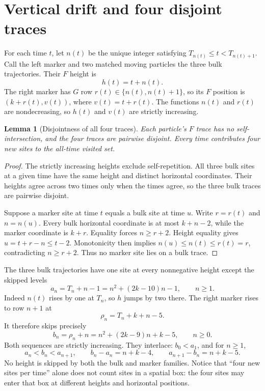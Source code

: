 \documentclass[11pt,letterpaper]{article}
\numberwithin{equation}{section}
\newtheorem{lemma}[theorem]{Lemma}
\theoremstyle{definition}
\theoremstyle{remark}
\begin{document}
\section{Vertical drift and four disjoint traces}\label{smc:bp:sec:drift}
For each time $t$, let $n(t)$ be the unique integer satisfying $T_{n(t)}\le t<T_{n(t)+1}$. Call the left marker and two matched moving particles the three bulk trajectories. Their $F$ height is
\[
h(t)=t+n(t).
\]
The right marker has $G$ row $r(t)\in\{n(t),n(t)+1\}$, so its $F$ position is $(k+r(t),v(t))$, where $v(t)=t+r(t)$. The functions $n(t)$ and $r(t)$ are nondecreasing, so $h(t)$ and $v(t)$ are strictly increasing.

\begin{lemma}[Disjointness of all four traces]\label{smc:bp:lem:traces}
Each particle's $F$ trace has no self-intersection, and the four traces are pairwise disjoint. Every time contributes four new sites to the all-time visited set.
\end{lemma}
\begin{proof}
The strictly increasing heights exclude self-repetition. All three bulk sites at a given time have the same height and distinct horizontal coordinates. Their heights agree across two times only when the times agree, so the three bulk traces are pairwise disjoint.

Suppose a marker site at time $t$ equals a bulk site at time $u$. Write $r=r(t)$ and $n=n(u)$. Every bulk horizontal coordinate is at most $k+n-2$, while the marker coordinate is $k+r$. Equality forces $n\ge r+2$. Height equality gives $u=t+r-n\le t-2$. Monotonicity then implies $n(u)\le n(t)\le r(t)=r$, contradicting $n\ge r+2$. Thus no marker site lies on a bulk trace.
\end{proof}

The three bulk trajectories have one site at every nonnegative height except the skipped levels
\begin{equation}\label{smc:bp:eq:a}
a_n=T_n+n-1=n^2+(2k-10)n-1,\qquad n\ge1.
\end{equation}
Indeed $n(t)$ rises by one at $T_n$, so $h$ jumps by two there. The right marker rises to row $n+1$ at
\[
\rho_n=T_n+k+n-5.
\]
It therefore skips precisely
\begin{equation}\label{smc:bp:eq:b}
b_n=\rho_n+n=n^2+(2k-9)n+k-5,\qquad n\ge0.
\end{equation}
Both sequences are strictly increasing. They interlace: $b_0<a_1$, and for $n\ge1$,
\[
a_n<b_n<a_{n+1},\qquad
b_n-a_n=n+k-4,\qquad a_{n+1}-b_n=n+k-5.
\]
No height is skipped by both the bulk and marker families. Notice that ``four new sites per time'' alone does not count sites in a spatial box: the four sites may enter that box at different heights and horizontal positions.
\end{document}
